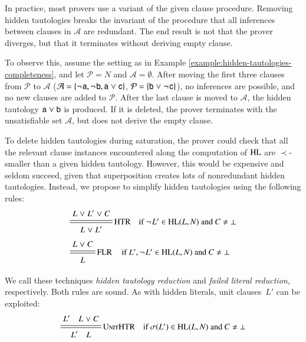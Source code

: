 \begin{rep}
   \newcommand{\aset}{\mathcal{A}}
   \newcommand{\pset}{\mathcal{P}}
   
   In practice, most provers use a variant of the given clause procedure.
   Removing hidden tautologies breaks the invariant of the procedure that all
   inferences between clauses in $\aset$ are redundant. The end result is not
   that the prover diverges, but that it terminates without deriving empty
   clause.

   To observe this, assume the setting as in Example
   \ref{example:hidden-tautologies-completeness}, and let $\pset=N$ and
   $\aset=\emptyset$. After moving the first three clauses from $\pset$ to
   $\aset$ ($\aset = \{ \negpredlit{\cst{a}}, \negpredlit{\cst{b}}, \pospredlit{\cst{a}} \cor
   \pospredlit{\cst{c}} \}$, $\pset = \{\pospredlit{\cst{b}} \cor \negpredlit{\cst{c}}\}$), 
   no inferences are possible, and no new clauses are added to $\pset$. After the last clause
   is moved to $\aset$, the hidden tautology ${\mathsf{a}} \mathrel{\lor} {\mathsf{b}}$
   is produced. If it is deleted, the prover terminates with the unsatisfiable set $\aset$,
   but does not derive the empty clause. 
\end{rep}

To delete hidden tautologies during saturation, the prover could check that all
the relevant clause instances encountered along the computation of $\mathrm{HL}$ are
$\prec$-smaller than a given hidden tautology. However, this would be expensive
and seldom succeed, given that superposition creates lots of nonredundant
hidden tautologies. Instead, we propose to simplify hidden tautologies using the
following rules:
%
%
\begin{align*}
   & \namedsimpsc{HTR}{L \cor L' \cor C}{L \cor L'}{\neglit{L'} \in \HL(L, N) \text{~and~} C \not= \bot} \\[.5\jot]
   & \namedsimpsc{\rlap{FLR}\phantom{HTR}}{L \cor C}{L}{L',\neglit{L'} \in \HL(L, N) \text{~and~} C \not= \bot}
\end{align*}
%

%
We call these techniques \emph{hidden tautology reduction} and \emph{failed literal
reduction}, respectively.
%
Both rules are sound.
%
As with hidden literals, unit clauses~$L'$ can be exploited:
\[\namedsimpsc{UnitHTR}{L' \quad L \cor C}{L' \quad L}{\sigmaterm{L'} \in \HL(L,N) \text{~and~} C \not= \bot}
\]

